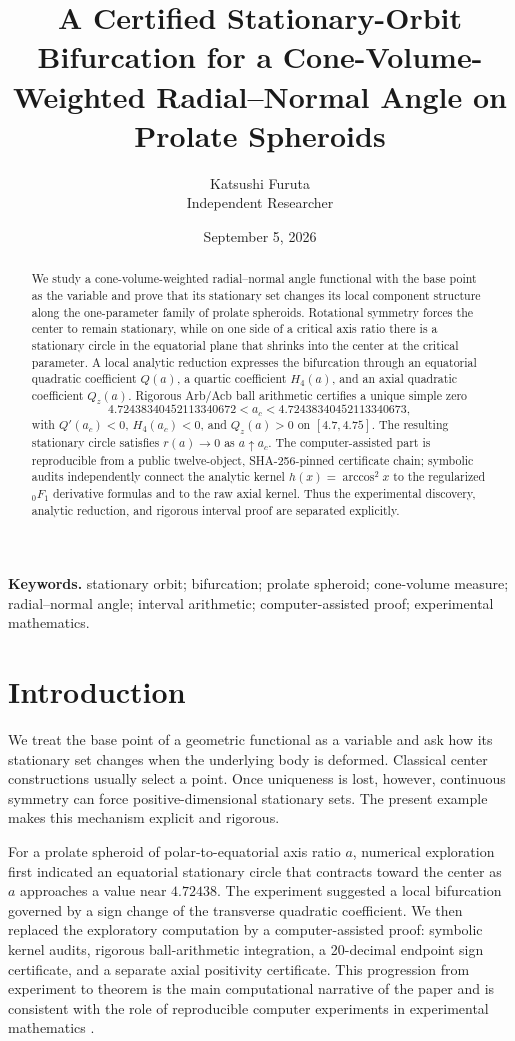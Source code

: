 \documentclass[11pt]{article}
\title{A Certified Stationary-Orbit Bifurcation for a Cone-Volume-Weighted Radial--Normal Angle on Prolate Spheroids}
\author{Katsushi Furuta\\Independent Researcher}
\date{September 5, 2026}
\begin{document}
\maketitle
\begin{abstract}
We study a cone-volume-weighted radial--normal angle functional with the base point as the variable and prove that its stationary set changes its local component structure along the one-parameter family of prolate spheroids. Rotational symmetry forces the center to remain stationary, while on one side of a critical axis ratio there is a stationary circle in the equatorial plane that shrinks into the center at the critical parameter. A local analytic reduction expresses the bifurcation through an equatorial quadratic coefficient $Q(a)$, a quartic coefficient $H_4(a)$, and an axial quadratic coefficient $Q_z(a)$. Rigorous Arb/Acb ball arithmetic certifies a unique simple zero
\[
4.72438340452113340672<a_c<4.72438340452113340673,
\]
with $Q'(a_c)<0$, $H_4(a_c)<0$, and $Q_z(a)>0$ on $[4.7,4.75]$. The resulting stationary circle satisfies $r(a)\to0$ as $a\uparrow a_c$. The computer-assisted part is reproducible from a public twelve-object, SHA-256-pinned certificate chain; symbolic audits independently connect the analytic kernel $h(x)=\arccos^2x$ to the regularized ${}_0F_1$ derivative formulas and to the raw axial kernel. Thus the experimental discovery, analytic reduction, and rigorous interval proof are separated explicitly.
\end{abstract}
\noindent\textbf{Keywords.} stationary orbit; bifurcation; prolate spheroid; cone-volume measure; radial--normal angle; interval arithmetic; computer-assisted proof; experimental mathematics.

\section{Introduction}
We treat the base point of a geometric functional as a variable and ask how its stationary set changes when the underlying body is deformed. Classical center constructions usually select a point. Once uniqueness is lost, however, continuous symmetry can force positive-dimensional stationary sets. The present example makes this mechanism explicit and rigorous.

For a prolate spheroid of polar-to-equatorial axis ratio $a$, numerical exploration first indicated an equatorial stationary circle that contracts toward the center as $a$ approaches a value near $4.72438$. The experiment suggested a local bifurcation governed by a sign change of the transverse quadratic coefficient. We then replaced the exploratory computation by a computer-assisted proof: symbolic kernel audits, rigorous ball-arithmetic integration, a 20-decimal endpoint sign certificate, and a separate axial positivity certificate. This progression from experiment to theorem is the main computational narrative of the paper and is consistent with the role of reproducible computer experiments in experimental mathematics \cite{BorweinBailey}.
\end{document}
